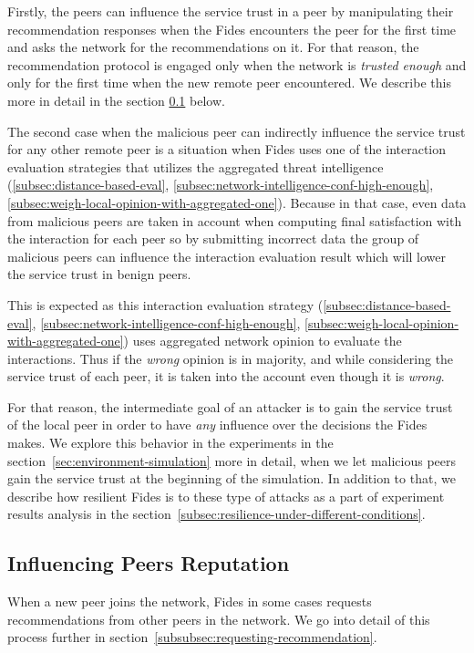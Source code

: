 Firstly, the peers can influence the service trust in a peer by manipulating their recommendation responses when the Fides encounters the peer for the first time and asks the network for the recommendations on it.
For that reason, the recommendation protocol is engaged only when the network is \textit{trusted enough} and only for the first time when the new remote peer encountered. We describe this more in detail in the section \ref{subsec:influencing-peers-reputation} below.

The second case when the malicious peer can indirectly influence the service trust for any other remote peer is a situation when Fides uses one of the interaction evaluation strategies that utilizes the aggregated threat intelligence (\ref{subsec:distance-based-eval}, \ref{subsec:network-intelligence-conf-high-enough}, \ref{subsec:weigh-local-opinion-with-aggregated-one}).
Because in that case, even data from malicious peers are taken in account when computing final satisfaction with the interaction for each peer so by submitting incorrect data the group of malicious peers can influence the interaction evaluation result which will lower the service trust in benign peers.

This is expected as this interaction evaluation strategy (\ref{subsec:distance-based-eval}, \ref{subsec:network-intelligence-conf-high-enough}, \ref{subsec:weigh-local-opinion-with-aggregated-one}) uses aggregated network opinion to evaluate the interactions.
Thus if the \textit{wrong} opinion is in majority, and while considering the service trust of each peer, it is taken into the account even though it is \textit{wrong}.

For that reason, the intermediate goal of an attacker is to gain the service trust of the local peer in order to have \textit{any} influence over the decisions the Fides makes.
We explore this behavior in the experiments in the section~\ref{sec:environment-simulation} more in detail, when we let malicious peers gain the service trust at the beginning of the simulation. In addition to that, we describe how resilient Fides is to these type of attacks as a part of experiment results analysis in the section~\ref{subsec:resilience-under-different-conditions}.

\subsection{Influencing Peers Reputation}
\label{subsec:influencing-peers-reputation}
When a new peer joins the network, Fides in some cases requests recommendations from other peers in the network.
We go into detail of this process further in section~\ref{subsubsec:requesting-recommendation}.

